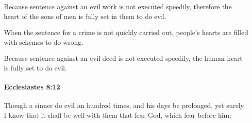 			\begin{versebox}
					\item[BHS] 
					\item[LXX] 
					\item[ASV] Because sentence against an evil work is not executed speedily, therefore the heart of the sons of men is fully set in them to do evil.
					\item[NIV] When the sentence for a crime is not quickly carried out, people’s hearts are filled with schemes to do wrong.
					\item[NRSV] Because sentence against an evil deed is not executed speedily, the human heart is fully set to do evil.
			\end{versebox}

		\paragraph{Ecclesiastes 8:12} %
			\label{ECCLESIASTES-8-12}

			Though a sinner do evil an hundred times, and his days be prolonged, yet surely I know that it shall be well with them that fear God, which fear before him:

